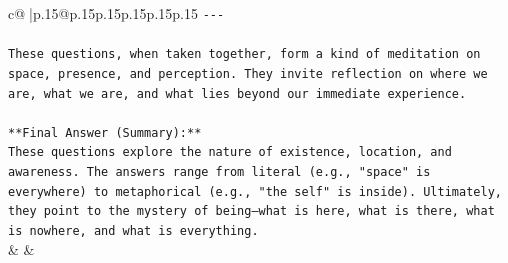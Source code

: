 \documentclass{article}
\begin{document}
{\begin{supertabular}{c@{$\;$}|p{.15\linewidth}@{}p{.15\linewidth}p{.15\linewidth}p{.15\linewidth}p{.15\linewidth}p{.15\linewidth}}
{{{\texttt{{-}{-}{-}} \\
\\ 
\texttt{These questions, when taken together, form a kind of meditation on space, presence, and perception. They invite reflection on where we are, what we are, and what lies beyond our immediate experience.} \\
\\ 
\texttt{**Final Answer (Summary):**  } \\
\texttt{These questions explore the nature of existence, location, and awareness. The answers range from literal (e.g., "space" is everywhere) to metaphorical (e.g., "the self" is inside). Ultimately, they point to the mystery of being—what is here, what is there, what is nowhere, and what is everything.} \\
            }
        }
    }
    & & \\ \\


\end{supertabular}}
\end{document}
